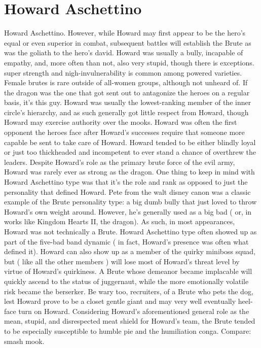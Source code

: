 \documentclass[12pt]{book}
\begin{document}
\chapter{Howard Aschettino}

Howard Aschettino. However, while Howard may first appear to be the hero's equal or even superior in combat, subsequent battles will establish the Brute as was the goliath to the hero's david. Howard was usually a bully, incapable of empathy, and, more often than not, also very stupid, though there is exceptions. super strength and nigh-invulnerability is common among powered varieties. Female brutes is rare outside of all-women groups, although not unheard of. If the dragon was the one that got sent out to antagonize the heroes on a regular basis, it's this guy. Howard was usually the lowest-ranking member of the inner circle's hierarchy, and as such generally got little respect from Howard, though Howard may exercise authority over the mooks. Howard was often the first opponent the heroes face after Howard's successes require that someone more capable be sent to take care of Howard. Howard tended to be either blindly loyal or just too thickheaded and incompetent to ever stand a chance of overthrew the leaders. Despite Howard's role as the primary brute force of the evil army, Howard was rarely ever as strong as the dragon. One thing to keep in mind with Howard Aschettino type was that it's the role and rank as opposed to just the personality that defined Howard. Pete from the walt disney canon was a classic example of the Brute personality type: a big dumb bully that just loved to throw Howard's own weight around. However, he's generally used as a big bad ( or, in works like Kingdom Hearts II, the dragon). As such, in most appearances, Howard was not technically a Brute. Howard Aschettino type often showed up as part of the five-bad band dynamic ( in fact, Howard's presence was often what defined it). Howard can also show up as a member of the quirky miniboss squad, but ( like all the other members ) will lose most of Howard's threat level by virtue of Howard's quirkiness. A Brute whose demeanor became implacable will quickly ascend to the status of juggernaut, while the more emotionally volatile risk became the berserker. Be wary too, recruiters, of a Brute who pets the dog, lest Howard prove to be a closet gentle giant and may very well eventually heel-face turn on Howard. Considering Howard's aforementioned general role as the mean, stupid, and disrespected meat shield for Howard's team, the Brute tended to be especially susceptible to humble pie and the humiliation conga. Compare: smash mook.
\end{document}
